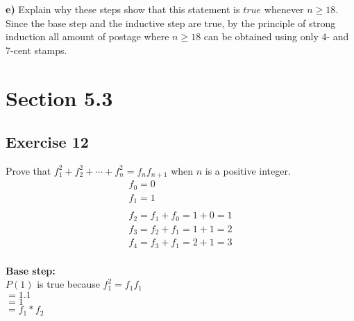 \documentclass[12pt]{article}
\begin{document}
    \textbf{e)} Explain why these steps show that this statement is $true$ whenever $n\geq 18$.\\
    Since the base step and the inductive step are true, by the principle of strong induction all amount of postage where $n \geq 18$ can be obtained using only 4- and 7-cent stamps.


    \section{Section 5.3}
    \subsection{Exercise 12}
    Prove that $f_1^2 +f_2^2 +\cdots+f_n^2 =f_nf_{n+1}$ when $n$ is a positive integer.
    \begin{equation}
        \begin{split}
                    f_{0} = 0\\
                    f_{1} = 1\\
                    \\
                    f_{2} = f_{1}+f_{0}=1+0=1 \\
                    f_{3} = f_{2}+f_{1}=1+1=2 \\
                    f_{4} = f_{3}+f_{1}=2+1=3 \\
        \end{split}
    \end{equation}
    
    \textbf{Base step:} \\
    $P(1)$ is true because $f_{1}^2 = f_{1}f_{1}$\\
    $= 1.1$\\
    $= 1$\\
    $= f_1*f_2$\\
    \\
    
\end{document}
